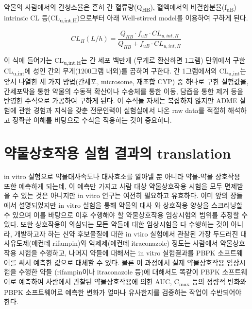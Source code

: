 \documentclass[
  11pt,
  krantz2, a4paper, twoside]{krantz}
\begin{document}
약물의 사람에서의 간청소율은 흔히 간 혈류량(Q\textsubscript{HB}), 혈액에서의
비결합분율(f\textsubscript{uB}) intrinsic CL 등(CL\textsubscript{u,int,H})으로부터 아래 Well-stirred
model를 이용하여 구하게 된다.

\begin{equation}
{CL}_{H}(L/h) = \frac{Q_{HB} \cdot f_{uB} \cdot {CL}_{u,int,H}}{Q_{HB} + f_{uB} \cdot {CL}_{u,int,H}}
\label{eq:eq08-01} 
\end{equation}

이 식에 들어가는 CL\textsubscript{u,int,H}는 간 세포 백만개 (무게로 환산하면 1그램)
단위에서 구한 CL\textsubscript{u,int}에 성인 간의 무게(1200그램 내외)를 곱하여 구한다.
간 1그램에서의 CL\textsubscript{u,int}는 앞서 나열한 세 가지 방법(간세포, microsome,
재조합 CYP) 중 하나로 구한 실험값을, 간세포막을 통한 약물의 수동적
확산이나 수송체를 통한 이동, 담즙을 통한 제거 등을 반영한 수식으로
가공하여 구하게 된다. 이 수식들 자체는 복잡하지 않지만 ADME 실험에 관한
경험과 지식을 갖춘 전문인력이 실험실에서 나온 raw data를 적절히 해석하고
정확한 이해를 바탕으로 수식을 적용하는 것이 중요하다.

\hypertarget{uxc57duxbb3cuxc0c1uxd638uxc791uxc6a9-uxc2e4uxd5d8-uxacb0uxacfcuxc758-translation}{%
\section{약물상호작용 실험 결과의 translation}\label{uxc57duxbb3cuxc0c1uxd638uxc791uxc6a9-uxc2e4uxd5d8-uxacb0uxacfcuxc758-translation}}

in vitro 실험으로 약물대사속도나 대사효소를 알아낼 뿐 아니라 약물-약물
상호작용 또한 예측하게 되는데, 이 예측만 가지고 사람 대상 약물상호작용
시험을 모두 면제받을 수 있는 것은 아니지만 in vitro 연구는 여전히
필요하고 유효하다. 이미 앞의 장들에서 설명되었지만 in vitro 실험을 통해
약물의 대사 와 상호작용 양상을 스크리닝할 수 있으며 이를 바탕으로 이후
수행해야 할 약물상호작용 임상시험의 범위를 추정할 수 있다. 또한
상호작용이 의심되는 모든 약들에 대한 임상시험을 다 수행하는 것이 아니라,
개발하고자 하는 신약 후보물질에 대한 in vtiro 실험에서 관찰된 가장
두드러진 대사유도제(예컨데 rifampin)와 억제제(예컨데 itraconazole)
정도는 사람에서 약물상호작용 시험을 수행하고, 나머지 약들에 대해서는 in
vitro 실험결과를 PBPK 소프트웨어를 써서 예측한 값으로 대체할 수 있다.
물론 이 과정에서 실제 약물상호작용 임상시험을 수행한 약들 (rifampin이나
itraconazole 등)에 대해서도 똑같이 PBPK 소프트웨어로 예측하여 사람에서
관찰된 약물상호작용에 의한 AUC, C\textsubscript{max} 등의 정량적 변화와 PBPK
소프트웨어로 예측한 변화가 얼마나 유사한지를 검증하는 작업이 수반되어야
한다.
\end{document}
